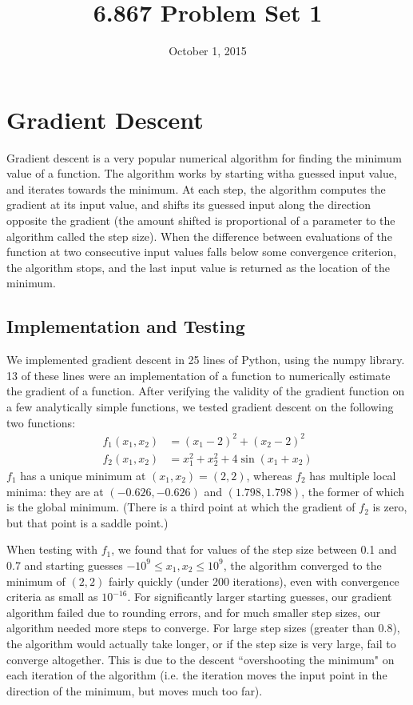 \documentclass{article}
\title{6.867 Problem Set 1}
\date{October 1, 2015}
\begin{document}
\maketitle
\section{Gradient Descent}
Gradient descent is a very popular numerical algorithm for finding the minimum value of a function. The algorithm works by starting witha guessed input value, and iterates towards the minimum. At each step, the algorithm computes the gradient at its input value, and shifts its guessed input along the direction opposite the gradient (the amount shifted is proportional of a parameter to the algorithm called the step size). When the difference between evaluations of the function at two consecutive input values falls below some convergence criterion, the algorithm stops, and the last input value is returned as the location of the minimum.

\subsection{Implementation and Testing}
We implemented gradient descent in 25 lines of Python, using the numpy library. 13 of these lines were an implementation of a function to numerically estimate the gradient of a function. After verifying the validity of the gradient function on a few analytically simple functions, we tested gradient descent on the following two functions:
\begin{align*}
f_1(x_1, x_2) &= (x_1-2)^2 + (x_2-2)^2\\
f_2(x_1, x_2) &= x_1^2 + x_2^2 + 4\sin (x_1 + x_2)
\end{align*}
$f_1$ has a unique minimum at $(x_1, x_2) = (2,2)$, whereas $f_2$ has multiple local minima: they are at $(-0.626, -0.626)$ and $(1.798, 1.798)$, the former of which is the global minimum. (There is a third point at which the gradient of $f_2$ is zero, but that point is a saddle point.)

When testing with $f_1$, we found that for values of the step size between 0.1 and 0.7 and starting guesses $-10^{9} \le x_1, x_2 \le 10^{9}$, the algorithm converged to the minimum of $(2,2)$ fairly quickly (under 200 iterations), even with convergence criteria as small as $10^{-16}$. For significantly larger starting guesses, our gradient algorithm failed due to rounding errors, and for much smaller step sizes, our algorithm needed more steps to converge. For large step sizes (greater than $0.8$), the algorithm would actually take longer, or if the step size is very large, fail to converge altogether. This is due to the descent ``overshooting the minimum" on each iteration of the algorithm (i.e. the iteration moves the input point in the direction of the minimum, but moves much too far).
\end{document}
